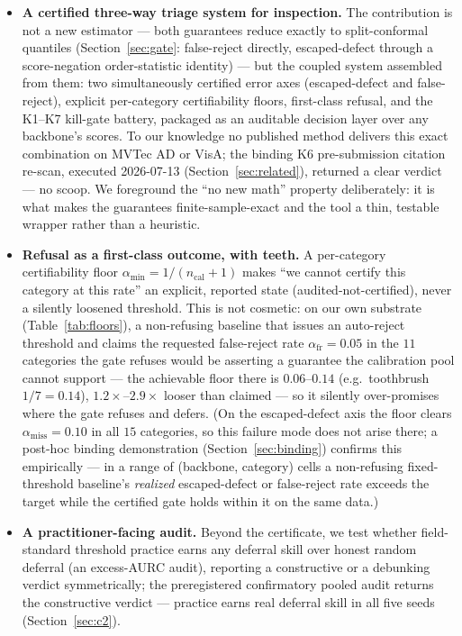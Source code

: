 \documentclass[11pt]{article}
\begin{document}
\begin{itemize}
  \item \textbf{A certified three-way triage system for inspection.} The contribution is not
        a new estimator --- both guarantees reduce exactly to split-conformal quantiles
        (Section~\ref{sec:gate}: false-reject directly, escaped-defect through a score-negation
        order-statistic identity) --- but the coupled system assembled from them: two
        simultaneously certified error axes (escaped-defect and false-reject), explicit
        per-category certifiability floors, first-class refusal, and the K1--K7 kill-gate battery,
        packaged as an auditable decision layer over any backbone's scores. To our knowledge no
        published method delivers this exact combination on MVTec AD or VisA; the binding K6
        pre-submission citation re-scan, executed 2026-07-13 (Section~\ref{sec:related}), returned a
        clear verdict --- no scoop. We foreground the ``no new math''
        property deliberately: it is what makes the guarantees finite-sample-exact and the tool a
        thin, testable wrapper rather than a heuristic.
  \item \textbf{Refusal as a first-class outcome, with teeth.} A per-category certifiability floor
        $\alpha_{\min}=1/(n_{\text{cal}}+1)$ makes ``we cannot certify this category at this rate''
        an explicit, reported state (audited-not-certified), never a silently loosened threshold.
        This is not cosmetic: on our own substrate (Table~\ref{tab:floors}), a non-refusing baseline
        that issues an auto-reject threshold and claims the requested false-reject rate
        $\alpha_{\text{fr}}=0.05$ in the $11$ categories the gate refuses would be asserting a
        guarantee the calibration pool cannot support --- the achievable floor there is
        $0.06$--$0.14$ (e.g.\ toothbrush $1/7=0.14$), $1.2\times$--$2.9\times$ looser than claimed --- so
        it silently over-promises where the gate refuses and defers. (On the escaped-defect axis the
        floor clears $\alpha_{\text{miss}}=0.10$ in all $15$ categories, so this failure mode does
        not arise there; a post-hoc binding demonstration (Section~\ref{sec:binding}) confirms this
        empirically --- in a range of (backbone, category) cells a non-refusing fixed-threshold
        baseline's \emph{realized} escaped-defect or false-reject rate exceeds the target while the
        certified gate holds within it on the same data.)
  \item \textbf{A practitioner-facing audit.} Beyond the certificate, we test whether
        field-standard threshold practice earns any deferral skill over honest random deferral
        (an excess-AURC audit), reporting a constructive or a debunking verdict symmetrically; the
        preregistered confirmatory pooled audit returns the constructive verdict --- practice earns
        real deferral skill in all five seeds (Section~\ref{sec:c2}).
\end{itemize}
\end{document}
